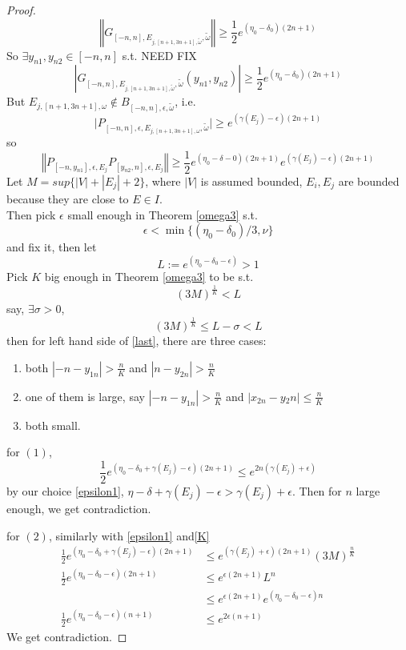 \begin{proof}
\[
  \left\Vert G_{[-n,n],E_{j,[n+1,3n+1],\tilde{\omega}},\tilde{\omega}}\right\Vert\geq \frac{1}{2}e^{(\eta_0-\delta_0)(2n+1)}
\]
So $\exists y_{n1},y_{n2}\in [-n,n]$ s.t.
NEED FIX
\[
  \left\vert G_{[-n,n],E_{j,[n+1,3n+1],\tilde{\omega}},\tilde{\omega}}(y_{n1},y_{n2})\right\vert\geq \frac{1}{2}e^{(\eta_0-\delta_0)(2n+1)}
\]
But $E_{j,[n+1,3n+1],\omega}\notin B_{[-n,n],\epsilon,\tilde{\omega}}$, i.e.
\[
\vert P_{[-n,n],\epsilon,E_{j,[n+1,3n+1],\omega},\tilde{\omega}}\vert\geq e^{(\gamma(E_j)-\epsilon)(2n+1)}
\]
so
\begin{equation}\label{last}
  \left\Vert P_{[-n,y_{n1}],\epsilon,E_j}P_{[y_{n2},n],\epsilon,E_j}\right\Vert\geq\frac{1}{2}e^{(\eta_0-\delta-0)(2n+1)}e^{(\gamma(E_j)-\epsilon)(2n+1)}
\end{equation}
Let $M= sup\{|V|+|E_j|+2\}$, where $|V|$ is assumed bounded, $E_i,E_j$ are bounded because they are close to $E\in I$.\\
Then pick $\epsilon$ small enough in Theorem \ref{omega3} s.t.
  \begin{equation}\label{epsilon1}
    \epsilon<\min\{(\eta_0-\delta_0)/3,\nu\}
  \end{equation}
and fix it, then let
  \[L:=e^{(\eta_0-\delta_0-\epsilon)}>1\]
Pick $K$ big enough in Theorem \ref{omega3} to be s.t.
  \[(3M)^{\frac{1}{K}}<L\]
say, $\exists \sigma>0$,
\begin{equation}\label{K}
(3M)^{\frac{1}{K}}\leq L-\sigma<L
\end{equation}
then for left hand side of \eqref{last}, there are three cases:
\begin{enumerate}
  \item both $|-n-y_{1n}|>\frac{n}{K}$ and $|n-y_{2n}|>\frac{n}{K}$
  \item one of them is large, say $|-n-y_{1n}|>\frac{n}{K}$ and $|x_{2n}-y{_2n}|\leq\frac{n}{K}$
  \item both small.
\end{enumerate}

for $(1)$,
\[
\frac{1}{2}e^{(\eta_0-\delta_0+\gamma(E_j)-\epsilon)(2n+1)}\leq e^{2n(\gamma(E_j)+\epsilon)}
\]
by our choice \eqref{epsilon1},
 $\eta-\delta+\gamma(E_j)-\epsilon>\gamma(E_j)+\epsilon$. Then for $n$ large enough, we get contradiction.

for $(2)$, similarly with \eqref{epsilon1} and\eqref{K}
\[
  \begin{aligned}
    \frac{1}{2}e^{(\eta_0-\delta_0+\gamma(E_j)-\epsilon)(2n+1)}
    &\leq e^{(\gamma(E_j)+\epsilon)(2n+1)}(3M)^{\frac{n}{K}}\\
    \frac{1}{2}e^{(\eta_0-\delta_0-\epsilon)(2n+1)}&\leq e^{\epsilon(2n+1)} L^n\\
    &\leq e^{\epsilon(2n+1)} e^{(\eta_0-\delta_0-\epsilon)n}\\
    \frac{1}{2}e^{(\eta_0-\delta_0-\epsilon)(n+1)}
    &\leq e^{2\epsilon(n+1)}
  \end{aligned}
\]
We get contradiction.


\end{proof}
